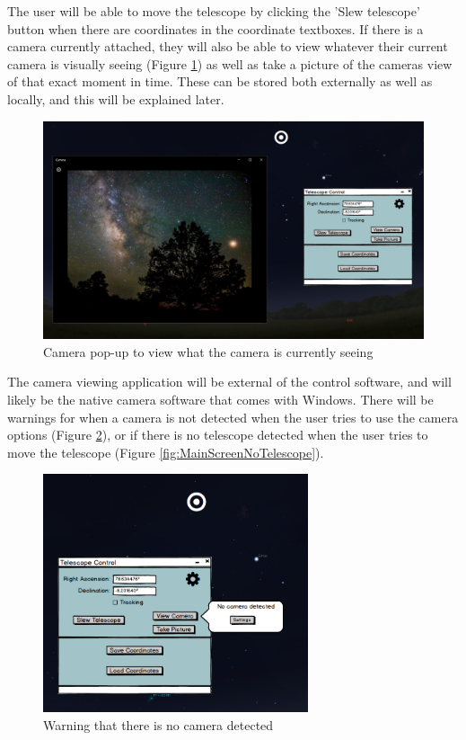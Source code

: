 \documentclass[12pt]{article}
\begin{document}
The user will be able to move the telescope by clicking the 'Slew telescope' button when there are coordinates in the coordinate textboxes. If there is a camera currently attached, they will also be able to view whatever their current camera is visually seeing (Figure \ref{fig:MainScreenwithCameraView}) as well as take a picture of the cameras view of that exact moment in time. These can be stored both externally as well as locally, and this will be explained later.

\newpage

\begin{figure}[h]
	\centering
	\includegraphics[width=0.90\linewidth]{MainScreenwithCameraView}
	\caption{Camera pop-up to view what the camera is currently seeing}
	\label{fig:MainScreenwithCameraView}
\end{figure}

The camera viewing application will be external of the control software, and will likely be the native camera software that comes with Windows. There will be warnings for when a camera is not detected when the user tries to use the camera options (Figure \ref{fig:NoCameraDetected}), or if there is no telescope detected when the user tries to move the telescope (Figure \ref{fig:MainScreenNoTelescope}).

\begin{figure}[h]
	\centering
	\includegraphics[width=0.70\linewidth, height=7cm]{NoCameraDetected}
	\caption{Warning that there is no camera detected}
	\label{fig:NoCameraDetected}
\end{figure}
\end{document}
